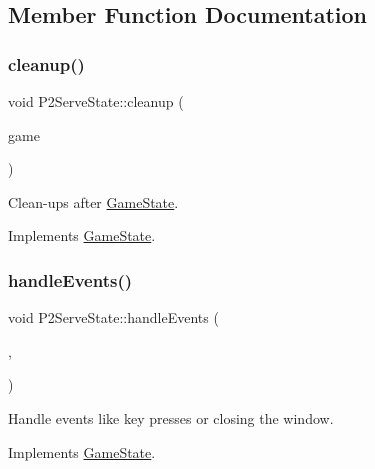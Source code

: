 \subsection{Member Function Documentation}
\mbox{\label{class_p2_serve_state_ab5cbfaef01142275fcb6aa2947c9e1b6}} 
\subsubsection{\texorpdfstring{cleanup()}{cleanup()}}
{\footnotesize\ttfamily void P2\+Serve\+State\+::cleanup (\begin{DoxyParamCaption}\item[{\mbox{\hyperlink{class_game_engine}{Game\+Engine}} $\ast$}]{game }\end{DoxyParamCaption})\hspace{0.3cm}{\ttfamily [virtual]}}



Clean-\/ups after \mbox{\hyperlink{class_game_state}{Game\+State}}. 



Implements \mbox{\hyperlink{class_game_state_a7df4ea0b4815d2b3b35dbec2a399a0b6}{Game\+State}}.

\mbox{\label{class_p2_serve_state_af7634dd3bdfca0279b5c9abc6632b2e4}} 
\subsubsection{\texorpdfstring{handleEvents()}{handleEvents()}}
{\footnotesize\ttfamily void P2\+Serve\+State\+::handle\+Events (\begin{DoxyParamCaption}\item[{\mbox{\hyperlink{class_game_engine}{Game\+Engine}} $\ast$}]{,  }\item[{sf\+::\+Event}]{ }\end{DoxyParamCaption})\hspace{0.3cm}{\ttfamily [virtual]}}



Handle events like key presses or closing the window. 



Implements \mbox{\hyperlink{class_game_state_a3ef0638514dbfe71581d593cf0f66ce5}{Game\+State}}.

